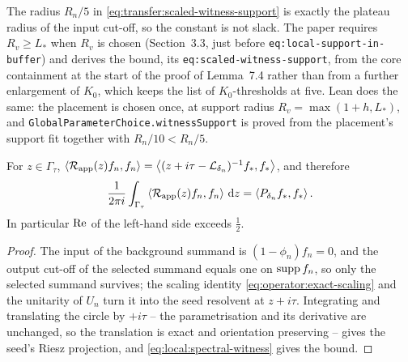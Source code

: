 The radius $R_n/5$ in \eqref{eq:transfer:scaled-witness-support} is exactly the plateau
radius of the input cut-off, so the constant is not slack.  The paper requires
$R_v\geq L_*$ when $R_v$ is chosen (Section~3.3, just before \texttt{eq:local-support-in-buffer})
and derives the bound, its \texttt{eq:scaled-witness-support}, from the core containment
at the start of the proof of Lemma~7.4 rather than from a further enlargement of $K_0$,
which keeps the list of $K_0$-thresholds at five.
Lean does the same: the placement is chosen once, at support radius
$R_v=\max(1+h,L_*)$, and \texttt{GlobalParameterChoice.witnessSupport} is proved
from the placement's support fit together with $R_n/10<R_n/5$.

\begin{lemma}
  \label{lem:transfer:contour-identity}
  \leanok
  For $z\in\Gamma_\tau$,
  $\left\langle\mathcal{R}_{\rm app}(z)f_n,f_n\right\rangle=\left\langle(z+i\tau-\mathcal{L}_{\delta_n})^{-1}f_*,f_*\right\rangle$, and
  therefore
  \begin{equation}
    \frac1{2\pi i}\int_{\Gamma_\tau}\left\langle\mathcal{R}_{\rm app}(z)f_n,f_n\right\rangle\,\mathrm{d} z
      =\left\langle P_{\delta_n}f_*,f_*\right\rangle .
    \label{eq:transfer:selected-contour-identity}
  \end{equation}
  In particular $\operatorname{Re}$ of the left-hand side exceeds $\tfrac12$.
\end{lemma}

\begin{proof}
  \leanok
  The input of the background summand is $(1-\phi_n)f_n=0$, and the output cut-off of the
  selected summand equals one on $\operatorname{supp} f_n$, so only the selected summand survives; the
  scaling identity \eqref{eq:operator:exact-scaling} and the unitarity of $U_n$ turn it into
  the seed resolvent at $z+i\tau$.  Integrating and translating the circle by $+i\tau$ --
  the parametrisation and its derivative are unchanged, so the translation is exact and
  orientation preserving -- gives the seed's Riesz projection, and
  \eqref{eq:local:spectral-witness} gives the bound.
\end{proof}

